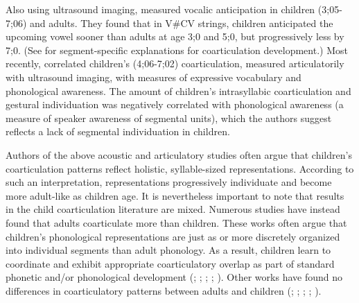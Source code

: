 \documentclass[a4paper,man,floatsintext,natbib,donotrepeattitle, apacite]{apa6}
\begin{document}
Also using ultrasound imaging, \citet{noirayBackFutureNonlinear2019} measured vocalic anticipation in children (3;05-7;06) and adults. They found that in V\#CV strings, children anticipated the upcoming vowel sooner than adults at age 3;0 and 5;0, but progressively less by 7;0. (See \citet{noirayHowChildrenOrganize2018} for segment-specific explanations for coarticulation development.) Most recently, \citet{noiraySpokenLanguageDevelopment2019} correlated children's (4;06-7;02) coarticulation, measured articulatorily with ultrasound imaging, with measures of expressive vocabulary and phonological awareness. The amount of children's intrasyllabic coarticulation and gestural individuation was negatively correlated with phonological awareness (a measure of speaker awareness of segmental units), which the authors suggest reflects a lack of segmental individuation in children. 

Authors of the above acoustic and articulatory studies often argue that children's coarticulation patterns reflect holistic, syllable-sized representations. According to such an interpretation, representations progressively individuate and become more adult-like as children age. It is nevertheless important to note that results in the child coarticulation literature are mixed. Numerous studies have instead found that adults coarticulate more than children. These works often argue that children's phonological representations are just as or more discretely organized into individual segments than adult phonology. As a result, children learn to coordinate and exhibit appropriate coarticulatory overlap as part of standard phonetic and/or phonological development (\citealt{barbierSpeechPlanningIndex2013}; \citealt{barbierSpeechPlanning4yearold2015}; \citealt{katzAnticipatoryCoarticulationSpeech1991}; \citealt{kentSegmentalOrganizationSpeech1983}; \citealt{whitesideSpeechPatternsChildren2000}). Other works have found no differences in coarticulatory patterns between adults and children (\citealt{flegeAnticipatoryCarryoverNasal1988}; \citealt{goffmanBreadthCoarticulatoryUnits2008}; \citealt{noirayDevelopmentMotorSynergies2013}; \citealt{serenoDevelopmentalAspectsLingual1987}; \citealt{serenoAcousticAnalysesPerceptual1987}).
\end{document}
